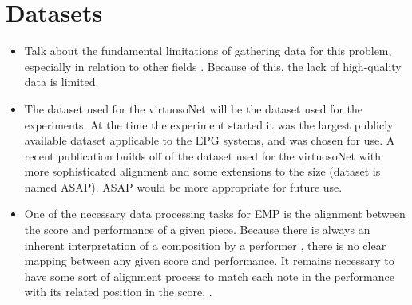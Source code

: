 \section{Datasets}
\begin{itemize}
    \item Talk about the fundamental limitations of gathering data for this problem, especially in relation to other fields \cite{friberg2006overview}. Because of this, the lack of high-quality data is limited. 
    \item The dataset used for the virtuosoNet \cite{jeong2019graph} \cite{jeong2019virtuosonet} will be the dataset used for the experiments. At the time the experiment started it was the largest publicly available dataset applicable to the EPG systems, and was chosen for use. A recent publication \cite{foscarin2020asap} builds off of the dataset used for the virtuosoNet with more sophisticated alignment and some extensions to the size (dataset is named ASAP). ASAP would be more appropriate for future use. 
    \item One of the necessary data processing tasks for EMP is the alignment between the score and performance of a given piece. Because there is always an inherent interpretation of a composition by a performer , there is no clear mapping between any given score and performance. It remains necessary to have some sort of alignment process to match each note in the performance with its related position in the score. .
\end{itemize}
